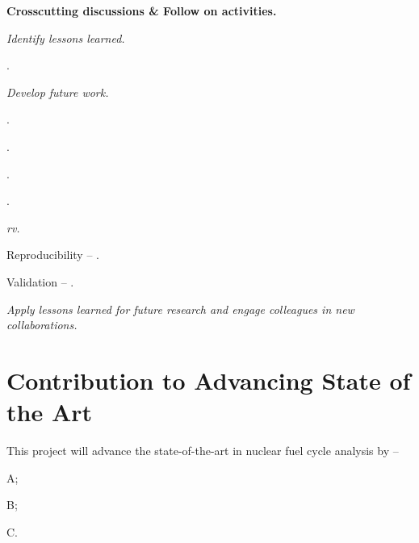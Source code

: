 \documentclass[11pt,a4paper]{article}
\newcommand{\acf}{\acrfull} %
\begin{document}
\begin{enumext}[resume=outerlist]
    \item\textbf{Crosscutting discussions \& Follow on activities.} 
        \begin{enumext}[resume=innerlist]
            \item\textit{Identify lessons learned.}
                \begin{enumext*}[topsep=0pt,itemsep=-0.5ex,partopsep=1ex,parsep=1ex,label=(\arabic*),columns=2]
                    \item .
                \end{enumext*}
            \item\textit{Develop future work.}
                \begin{enumext*}[topsep=0pt,itemsep=-0.5ex,partopsep=1ex,parsep=1ex,label=(\arabic*),columns=2]
                    \item .
                    \item . 
                    \item . 
                    \item .
                \end{enumext*}
            \item\textit{\acf{rv}.}
                \begin{enumext*}[topsep=0pt,itemsep=-0.5ex,partopsep=1ex,parsep=1ex,label=(\arabic*),columns=2]
                   \item Reproducibility -- .
                   \item Validation -- .
                \end{enumext*}
        \end{enumext}
\end{enumext}

\begin{enumext}[resume=milestone]
    \item\textit{Apply lessons learned for future research and engage colleagues in new collaborations.}
\end{enumext}


\section{Contribution to Advancing State of the Art}
This project will advance the state-of-the-art in nuclear fuel cycle analysis by --
\begin{enumext*}[topsep=0pt,itemsep=-0.5ex,partopsep=1ex,parsep=1ex,label=(\arabic*),columns=3]
    \item A; 
    \item B;
    \item C.
\end{enumext*}
\end{document}
